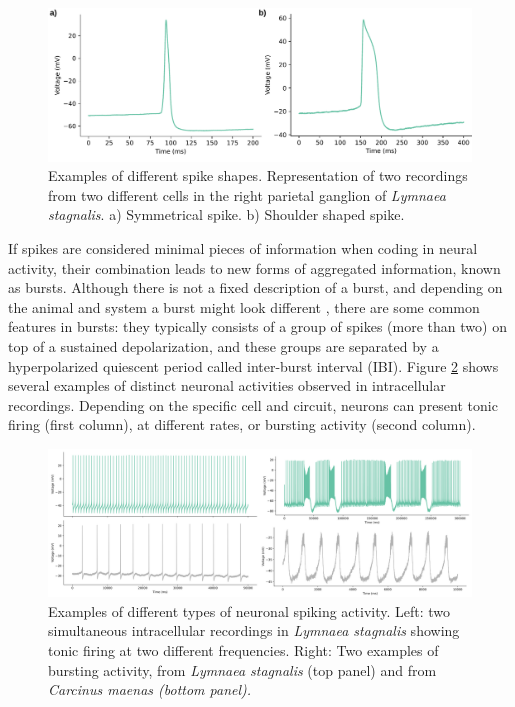 \begin{figure}[htb!]
    \centering
    \includegraphics[width=\linewidth]{img/intro/spike-types.pdf}
    \caption{Examples of different spike shapes. Representation of two recordings from two different cells in the right parietal ganglion of \textit{Lymnaea stagnalis}. a) Symmetrical spike. b) Shoulder shaped spike.}
    \label{fig:spike-types}
\end{figure}

If spikes are considered minimal pieces of information when coding in neural activity, their combination leads to new forms of aggregated information, known as bursts. Although there is not a fixed description of a burst, and depending on the animal and system a burst might look different \parencite{russell_bursting_1978,palmu_detection_2010,lundqvist_gamma_2016}, there are some common features in bursts: they typically consists of a group of spikes (more than two) on top of a sustained depolarization, and these groups are separated by a hyperpolarized quiescent period called inter-burst interval (IBI). Figure \ref{fig:spike_activity-types} shows several examples of distinct neuronal activities observed in intracellular recordings. Depending on the specific cell and circuit, neurons can present tonic firing (first column), at different rates, or bursting activity (second column). 
\begin{figure}[htb!]
    \centering
    \includegraphics[width=\linewidth]{img/intro/spike_activity-types.png}
    \caption{Examples of different types of neuronal spiking activity. Left: two simultaneous intracellular recordings in \textit{Lymnaea stagnalis} showing tonic firing at two different frequencies. Right: Two examples of bursting activity, from \textit{Lymnaea stagnalis} (top panel) and from \textit{Carcinus maenas (bottom panel).}}
    \label{fig:spike_activity-types}
\end{figure}

